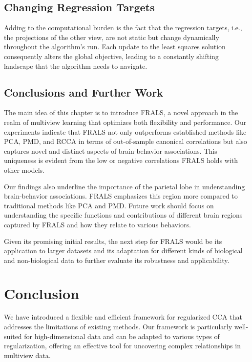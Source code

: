 \subsection{Changing Regression Targets}\label{subsec:changing-regression-targets}
Adding to the computational burden is the fact that the regression targets, i.e., the projections of the other view, are not static but change dynamically throughout the algorithm's run.
Each update to the least squares solution consequently alters the global objective, leading to a constantly shifting landscape that the algorithm needs to navigate.





\subsection{Conclusions and Further Work}
The main idea of this chapter is to introduce FRALS, a novel approach in the realm of multiview learning that optimizes
both flexibility and performance.
Our experiments indicate that FRALS not only outperforms established methods like PCA, PMD, and RCCA in terms of out-of-sample canonical correlations but also captures novel and distinct aspects of brain-behavior associations.
This uniqueness is evident from the low or negative correlations FRALS holds with other models.

Our findings also underline the importance of the parietal lobe in understanding brain-behavior associations.
FRALS emphasizes this region more compared to traditional methods like PCA and PMD. Future work should focus on understanding the specific functions and contributions of different brain regions captured by FRALS and how they relate to various behaviors.

Given its promising initial results, the next step for FRALS would be its application to larger datasets and its adaptation for different kinds of biological and non-biological data to further evaluate its robustness and applicability.



\section{Conclusion}

We have introduced a flexible and efficient framework for regularized CCA that addresses the limitations of existing methods.
Our framework is particularly well-suited for high-dimensional data and can be adapted to various types of regularization, offering an effective tool for uncovering complex relationships in multiview data.







